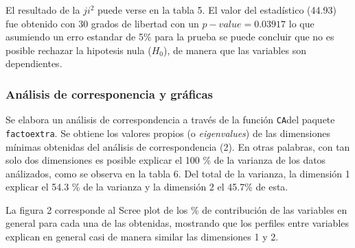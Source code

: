 \documentclass[
]{article}
\begin{document}
El resultado de la \(ji^2\) puede verse en la tabla 5. El valor del
estadístico (44.93) fue obtenido con 30 grados de libertad con un
\(p - value = 0.03917\) lo que asumiendo un erro estandar de 5\% para la
prueba se puede concluir que no es posible rechazar la hipotesis nula
(\(H_0\)), de manera que las variables son dependientes.

\hypertarget{anuxe1lisis-de-corresponencia-y-gruxe1ficas}{%
\subsubsection{Análisis de corresponencia y
gráficas}\label{anuxe1lisis-de-corresponencia-y-gruxe1ficas}}

Se elabora un análisis de correspondencia a través de la función
\texttt{CA}del paquete \texttt{factoextra}. Se obtiene los valores
propios (o \emph{eigenvalues}) de las dimensiones mínimas obtenidas del
análisis de correspondencia (2). En otras palabras, con tan solo dos
dimensiones es posible explicar el 100 \% de la varianza de los datos
análizados, como se observa en la tabla 6. Del total de la varianza, la
dimensión 1 explicar el 54.3 \% de la varianza y la dimensión 2 el
45.7\% de esta.

La figura 2 corresponde al Scree plot de los \% de contribución de las
variables en general para cada una de las obtenidas, mostrando que los
perfiles entre variables explican en general casi de manera similar las
dimensiones 1 y 2.
\end{document}
